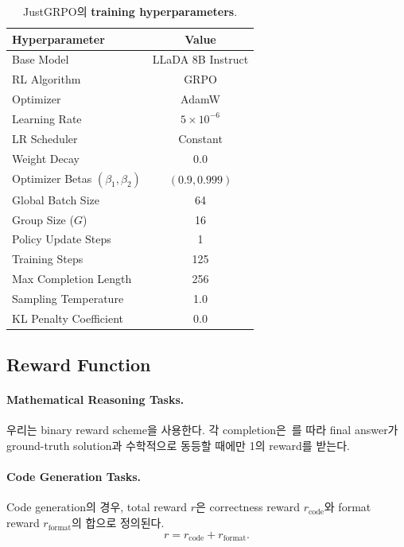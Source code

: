 \begin{table}[H]
    \centering
    \caption{JustGRPO의 \textbf{training hyperparameters}\protect\footnotemark{}.}
    \label{tab:hyperparams}
    \begin{tabular}{lc}
        \toprule
        \textbf{Hyperparameter} & \textbf{Value} \\
        \midrule
        Base Model & LLaDA 8B Instruct \\
        RL Algorithm & GRPO \\
        Optimizer & AdamW \\
        Learning Rate & $5 \times 10^{-6}$ \\
        LR Scheduler & Constant \\
        Weight Decay & 0.0 \\
        Optimizer Betas $(\beta_1, \beta_2)$ & $(0.9, 0.999)$ \\
        Global Batch Size & 64 \\
        Group Size ($G$) & 16 \\
        Policy Update Steps & 1 \\
        Training Steps & 125 \\
        Max Completion Length & 256 \\
        Sampling Temperature & 1.0 \\
        KL Penalty Coefficient & 0.0 \\
        \bottomrule
    \end{tabular}
\end{table}

\subsection{Reward Function}
\label{app:reward_function}

\paragraph{Mathematical Reasoning Tasks.}
우리는 binary reward scheme을 사용한다. 각 completion은~\cite{huang2025reinforcing}를 따라 final answer가 ground-truth solution과 수학적으로 동등할 때에만 1의 reward를 받는다.

\paragraph{Code Generation Tasks.}
Code generation의 경우, total reward $r$은 correctness reward $r_{\text{code}}$와 format reward $r_{\text{format}}$의 합으로 정의된다.
\begin{equation}
    r = r_{\text{code}} + r_{\text{format}}.
\end{equation}

